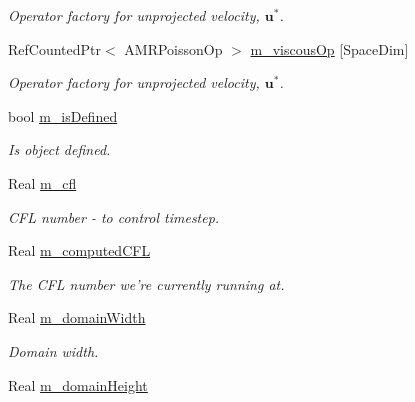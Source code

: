\begin{DoxyCompactItemize}
\begin{DoxyCompactList}\small\item\em Operator factory for unprojected velocity, $ \mathbf{u}^* $. \end{DoxyCompactList}\item 
Ref\-Counted\-Ptr$<$ A\-M\-R\-Poisson\-Op $>$ \hyperlink{class_a_m_r_level_mushy_layer_a4d91e3fa25799fc66e74808c545892b6}{m\-\_\-viscous\-Op} \mbox{[}Space\-Dim\mbox{]}
\begin{DoxyCompactList}\small\item\em Operator factory for unprojected velocity, $ \mathbf{u}^* $. \end{DoxyCompactList}\item 
\hypertarget{class_a_m_r_level_mushy_layer_a6b8c2c0a55b677d826818cf7f26128aa}{bool \hyperlink{class_a_m_r_level_mushy_layer_a6b8c2c0a55b677d826818cf7f26128aa}{m\-\_\-is\-Defined}}\label{class_a_m_r_level_mushy_layer_a6b8c2c0a55b677d826818cf7f26128aa}

\begin{DoxyCompactList}\small\item\em Is object defined. \end{DoxyCompactList}\item 
\hypertarget{class_a_m_r_level_mushy_layer_abb1c15fe65dcc4dfa75b229f47386f39}{Real \hyperlink{class_a_m_r_level_mushy_layer_abb1c15fe65dcc4dfa75b229f47386f39}{m\-\_\-cfl}}\label{class_a_m_r_level_mushy_layer_abb1c15fe65dcc4dfa75b229f47386f39}

\begin{DoxyCompactList}\small\item\em C\-F\-L number -\/ to control timestep. \end{DoxyCompactList}\item 
Real \hyperlink{class_a_m_r_level_mushy_layer_aa7a6e8a5cb2cb6f690c047e46d70547f}{m\-\_\-computed\-C\-F\-L}
\begin{DoxyCompactList}\small\item\em The C\-F\-L number we're currently running at. \end{DoxyCompactList}\item 
\hypertarget{class_a_m_r_level_mushy_layer_a84fc3ef3cdbf715c83ff6d78293e9fee}{Real \hyperlink{class_a_m_r_level_mushy_layer_a84fc3ef3cdbf715c83ff6d78293e9fee}{m\-\_\-domain\-Width}}\label{class_a_m_r_level_mushy_layer_a84fc3ef3cdbf715c83ff6d78293e9fee}

\begin{DoxyCompactList}\small\item\em Domain width. \end{DoxyCompactList}\item 
\hypertarget{class_a_m_r_level_mushy_layer_aa662bb49cb6956efb2998484054c2281}{Real \hyperlink{class_a_m_r_level_mushy_layer_aa662bb49cb6956efb2998484054c2281}{m\-\_\-domain\-Height}}\label{class_a_m_r_level_mushy_layer_aa662bb49cb6956efb2998484054c2281}


\end{DoxyCompactItemize}
